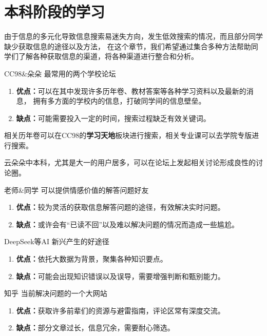 \documentclass{amznotes}
\begin{document}
\chapter{本科阶段的学习}
由于信息的多元化导致信息搜索易迷失方向，发生低效搜索的情况，而且部分同学缺少获取信息的途径以及方法，
在这个章节，我们希望通过集合多种方法帮助同学们了解各种获取信息的渠道，将各种渠道进行整合和分析。
\begin{jqbox}{CC98\&朵朵}{}
    最常用的两个学校论坛
    \tcblower
    \begin{enumerate}
        \item \textbf{优点：}可以在其中发现许多历年卷、教材答案等各种学习资料以及最新的消息，
        拥有多方面的学校内的信息，打破同学间的信息壁垒。
        \item \textbf{缺点：}可能需要投入一定的时间，搜索过程缺乏有效关键词。
    \end{enumerate}
    相关历年卷可以在CC98的\textbf{学习天地}板块进行搜索，相关专业课可以去学院专版进行搜索。

    云朵朵中本科，尤其是大一的用户居多，可以在论坛上发起相关讨论形成良性的讨论圈。
\end{jqbox}
\begin{jqbox}{老师\&同学}{}
    可以提供情感价值的解答问题好友
    \tcblower
    \begin{enumerate}
        \item \textbf{优点：}较为灵活的获取信息解答问题的途径，有效解决实时问题。
        \item \textbf{缺点：}或许会有“已读不回”以及难以解决问题的情况而造成一些尴尬。
    \end{enumerate}
\end{jqbox}

\begin{jqbox}{DeepSeek等AI}{}
    新兴产生的好途径
    \tcblower
    \begin{enumerate}
        \item \textbf{优点：}依托大数据为背景，聚集各种知识要点。
        \item \textbf{缺点：}可能会出现知识错误以及误导，需要增强判断和甄别能力。
    \end{enumerate}
\end{jqbox}

\begin{jqbox}{知乎}{}
    当前解决问题的一个大网站
    \tcblower
    \begin{enumerate}
        \item \textbf{优点：}获取许多前辈们的资源与避雷指南，评论区常有深度交流。
        \item \textbf{缺点：}部分文章过长，信息冗余，需要耐心筛选。
    \end{enumerate}
\end{jqbox}
\end{document}
